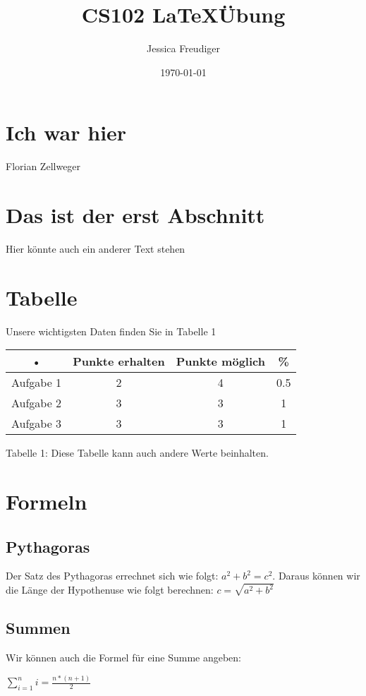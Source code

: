 \documentclass{article}
\title{CS102 \LaTeX \"Ubung}
\date{\today}
\author{Jessica Freudiger}
\begin{document}
\maketitle
\section{Ich war hier}
Florian Zellweger
\section{Das ist der erst Abschnitt}
Hier könnte auch ein anderer Text stehen
\section{Tabelle}
Unsere wichtigsten Daten finden Sie in Tabelle 1
\begin{center}
\begin{tabular}{c|c|c|c}
  • & Punkte erhalten & Punkte m\"oglich & \% \\ 
  \hline
 Aufgabe 1 & 2 & 4 & 0.5 \\  
 Aufgabe 2 & 3 & 3 & 1 \\ 
 Aufgabe 3 & 3 & 3 & 1 \\  
 \end{tabular} 

Tabelle 1: Diese Tabelle kann auch andere Werte beinhalten.
\end{center}
\section{Formeln}
\subsection{Pythagoras}
Der Satz des Pythagoras errechnet sich wie folgt: $a^2+b^2=c^2$. Daraus können wir die Länge der Hypothenuse wie folgt berechnen: $c=\sqrt{a^2+b^2}$
\subsection{Summen}
Wir können auch die Formel für eine Summe angeben:
\begin{center}
$\sum\limits_{i=1}^{n} i=\frac{n*(n+1)}{2}$ 
\end{center}
\end{document}
